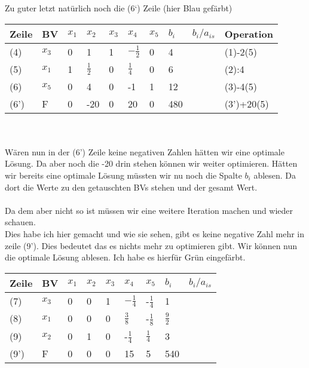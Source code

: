 \documentclass{article}
\begin{document}
Zu guter letzt natürlich noch die (6`) Zeile (hier Blau gefärbt)\\
\begin{tabular}{|l|l|l|l|l|l|l|l|l|l|}
	\hline
	Zeile & BV &$x_{1}$&$x_{2}$&$x_{3}$&$x_{4}$&$x_{5}$&$b_{i}$&$b_{i}/a_{is}$&Operation\\
	\hline
	(4)&$x_{3}$&0&1&1&$-\frac{1}{2}$&0&4&&(1)-2(5)\\
	\hline
	(5)&$x_{1}$&1&$\frac{1}{2}$&0&$\frac{1}{4}$&0&6&&(2):4\\
	\hline
	(6)&$x_{5}$&0&4&0&-1&1&12&&(3)-4(5)\\
	\hline
	(6')&F&\cellcolor{blue}0&\cellcolor{blue}-20&\cellcolor{blue}0&\cellcolor{blue}20&\cellcolor{blue}0&\cellcolor{blue}480&&(3')+20(5)\\
	\hline
\end{tabular}\\\\
Wären nun in der (6') Zeile keine negativen Zahlen hätten wir eine optimale Lösung. Da aber noch die -20 drin stehen können wir weiter optimieren. Hätten wir bereits eine optimale Lösung müssten wir nu noch die Spalte $b_{i}$ ablesen. Da dort die Werte zu den getauschten BVs stehen und der gesamt Wert.\\\\
Da dem aber nicht so ist müssen wir eine weitere Iteration machen und wieder schauen.\\
Dies habe ich hier gemacht und wie sie sehen, gibt es keine negative Zahl mehr in zeile (9'). Dies bedeutet das es nichts mehr zu optimieren gibt. Wir können nun die optimale Lösung ablesen. Ich habe es hierfür Grün eingefärbt. 
\begin{tabular}{|l|l|l|l|l|l|l|l|l|}
	\hline
	Zeile & BV &$x_{1}$&$x_{2}$&$x_{3}$&$x_{4}$&$x_{5}$&$b_{i}$&$b_{i}/a_{is}$\\
	\hline
	(7)&$x_{3}$&0&0&1&$-\frac{1}{4}$&-$\frac{1}{4}$&1&\\
	\hline
	(8)&\cellcolor{green}$x_{1}$&0&0&0&$\frac{3}{8}$&-$\frac{1}{8}$&\cellcolor{green}$\frac{9}{2}$&\\
	\hline
	(9)&\cellcolor{green}$x_{2}$&0&1&0&-$\frac{1}{4}$&$\frac{1}{4}$&\cellcolor{green}3&\\
	\hline
	(9')&\cellcolor{green}F&0&0&0&15&5&\cellcolor{green}540&\\
	\hline
\end{tabular}\\\\
\end{document}
